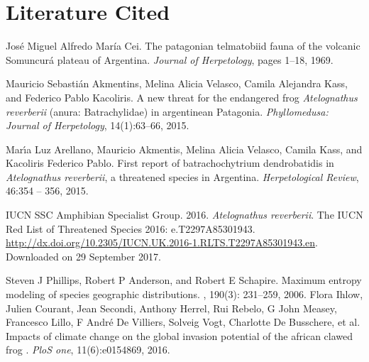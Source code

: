 \documentclass[11pt,a4paper,oneside]{article}
\begin{document}
\section*{Literature Cited}
\begingroup
\renewcommand{\section}[2]{}%
\begin{thebibliography}{6}

	José Miguel Alfredo María Cei.
	The patagonian telmatobiid fauna of the volcanic Somuncurá plateau of Argentina.
	\textit{Journal of Herpetology},
	pages 1–18,
	1969.

	Mauricio Sebastián Akmentins, Melina Alicia Velasco, Camila Alejandra Kass, and Federico Pablo Kacoliris. A new threat for the endangered frog \textit{Atelognathus reverberii}
(anura: Batrachylidae) in argentinean Patagonia.
	\textit{Phyllomedusa: Journal of Herpetology},
	14(1):63–66,
	2015.

	Marı́a Luz Arellano, Mauricio Akmentis, Melina Alicia Velasco, Camila Kass, and Kacoliris Federico Pablo. First report of batrachochytrium dendrobatidis in \textit{Atelognathus reverberii}, a threatened species in Argentina.
	\textit{Herpetological Review},
	46:354 – 356,
	2015.

	IUCN SSC Amphibian Specialist Group.
	2016.
	\textit{Atelognathus reverberii}.
	The IUCN Red List of Threatened Species 2016: e.T2297A85301943.
	\url{http://dx.doi.org/10.2305/IUCN.UK.2016-1.RLTS.T2297A85301943.en}.
	Downloaded on 29 September 2017.

	Steven J Phillips, Robert P Anderson, and Robert E Schapire.
	Maximum entropy modeling of species geographic distributions.
	,
	190(3): 231–259,
	2006.
	Flora Ihlow, Julien Courant, Jean Secondi, Anthony Herrel, Rui Rebelo, G John Measey,
Francesco Lillo, F André De Villiers, Solveig Vogt, Charlotte De Busschere, et al.
	Impacts of climate change on the global invasion potential of the african clawed frog .
	\textit{PloS one},
	11(6):e0154869,
	2016.

\end{thebibliography}
\endgroup
\end{document}
